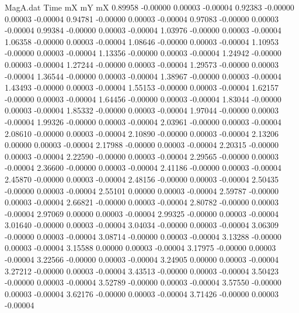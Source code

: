 \begin{filecontents}{MagA.dat}
Time mX mY mX
   0.89958   -0.00000    0.00003   -0.00004
   0.92383   -0.00000    0.00003   -0.00004
   0.94781   -0.00000    0.00003   -0.00004
   0.97083   -0.00000    0.00003   -0.00004
   0.99384   -0.00000    0.00003   -0.00004
   1.03976   -0.00000    0.00003   -0.00004
   1.06358   -0.00000    0.00003   -0.00004
   1.08646   -0.00000    0.00003   -0.00004
   1.10953   -0.00000    0.00003   -0.00004
   1.13356   -0.00000    0.00003   -0.00004
   1.24942   -0.00000    0.00003   -0.00004
   1.27244   -0.00000    0.00003   -0.00004
   1.29573   -0.00000    0.00003   -0.00004
   1.36544   -0.00000    0.00003   -0.00004
   1.38967   -0.00000    0.00003   -0.00004
   1.43493   -0.00000    0.00003   -0.00004
   1.55153   -0.00000    0.00003   -0.00004
   1.62157   -0.00000    0.00003   -0.00004
   1.64456   -0.00000    0.00003   -0.00004
   1.83044   -0.00000    0.00003   -0.00004
   1.85332   -0.00000    0.00003   -0.00004
   1.97044   -0.00000    0.00003   -0.00004
   1.99326   -0.00000    0.00003   -0.00004
   2.03961   -0.00000    0.00003   -0.00004
   2.08610   -0.00000    0.00003   -0.00004
   2.10890   -0.00000    0.00003   -0.00004
   2.13206    0.00000    0.00003   -0.00004
   2.17988   -0.00000    0.00003   -0.00004
   2.20315   -0.00000    0.00003   -0.00004
   2.22590   -0.00000    0.00003   -0.00004
   2.29565   -0.00000    0.00003   -0.00004
   2.36600   -0.00000    0.00003   -0.00004
   2.41186   -0.00000    0.00003   -0.00004
   2.45870   -0.00000    0.00003   -0.00004
   2.48156   -0.00000    0.00003   -0.00004
   2.50435   -0.00000    0.00003   -0.00004
   2.55101    0.00000    0.00003   -0.00004
   2.59787   -0.00000    0.00003   -0.00004
   2.66821   -0.00000    0.00003   -0.00004
   2.80782   -0.00000    0.00003   -0.00004
   2.97069    0.00000    0.00003   -0.00004
   2.99325   -0.00000    0.00003   -0.00004
   3.01640   -0.00000    0.00003   -0.00004
   3.04034   -0.00000    0.00003   -0.00004
   3.06309   -0.00000    0.00003   -0.00004
   3.08714   -0.00000    0.00003   -0.00004
   3.13288   -0.00000    0.00003   -0.00004
   3.15588    0.00000    0.00003   -0.00004
   3.17975   -0.00000    0.00003   -0.00004
   3.22566   -0.00000    0.00003   -0.00004
   3.24905    0.00000    0.00003   -0.00004
   3.27212   -0.00000    0.00003   -0.00004
   3.43513   -0.00000    0.00003   -0.00004
   3.50423   -0.00000    0.00003   -0.00004
   3.52789   -0.00000    0.00003   -0.00004
   3.57550   -0.00000    0.00003   -0.00004
   3.62176   -0.00000    0.00003   -0.00004
   3.71426   -0.00000    0.00003   -0.00004

\end{filecontents}
